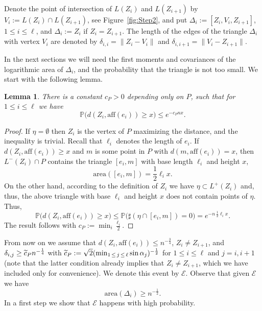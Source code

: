 \documentclass[10pt]{amsart}
\newtheorem{lemm}[theo]{Lemma}\newtheorem{prop}[theo]{Proposition}\newtheorem{coro}[theo]{Corollary}\newtheorem{conj}[theo]{Conjecture}
\theoremstyle{definition}\newtheorem{defi}[theo]{Definition}\newtheorem{rema}[theo]{Remark}\newtheorem{exam}[theo]{Example}\newtheorem{exem}[theo]{Example}\newtheorem{nota}[theo]{Notation}
\newcommand{\bbP}{\mathbb{P}}
\newcommand{\clE}{\mathcal{E}}
\newcommand{\area}{\mathrm{area}}
\newcommand{\aff}{\mathrm{aff}}
\let\oldtilde\tilde
\renewcommand*{\tilde}[1]{\mathchoice{\widetilde{#1}}{\widetilde{#1}}{\oldtilde{#1}}{\oldtilde{#1}}}
\begin{document}
Denote the point of intersection of $L(Z_i)$ and $L(Z_{i+1})$ by $V_{i}:=L(Z_i)\cap L(Z_{i+1})$, see Figure~\ref{fig:Step2}, and put $\Delta_i:=[Z_i,V_{i},Z_{i+1}]$, $1\leq i\leq \ell$, and $\Delta_i := Z_i$ if $Z_i=Z_{i+1}$. The length of the edges of the triangle $\Delta_i$ with vertex $V_i$ are denoted by $\delta_{i,i}=\|Z_i-V_i\| $ and $\delta_{i,i+1}= \| V_i - Z_{i+1} \| $.

In the next sections we will need the first moments and covariances of the logarithmic area of $\Delta_i$, and the probability that the triangle is not too small. We start with the following lemma.

\begin{lemm}\label{lm:smalldistanceedge}
There is a constant $c_P>0$ depending only on $P$, such that for $1\leq i\leq \ell$ we have
\[
\bbP\big(d(Z_{i}, \aff(e_i)) \geq x\big) \leq e^{- c_P n x}.
\]
\end{lemm}

\begin{proof}
If $\eta=\emptyset$ then $Z_i$ is the vertex of $P$ maximizing the distance, and the inequality is trivial. Recall that $\ell_i$ denotes the length of $e_i$. If $d(Z_{i}, \aff(e_i)) \geq x $ and $m$ is some point in $P$ with $d(m, \aff(e_i)) = x $, then $L^-(Z_i) \cap P$ contains the triangle $[e_i, m]$ with base length $\ell_i$ and height $x$,
\[
{\area}([e_i, m]) = \frac 12 \ell_i x.
\]
On the other hand, according to the definition of $Z_i$ we have $\eta \subset L^+(Z_i)$ and, thus, the above triangle with base $\ell_i$ and height $x$ does not contain points of $\eta$. Thus,
\[
\bbP\big(d(Z_{i}, \aff(e_i)) \geq x\big) \leq
\bbP\big(\sharp (\eta \cap [e_i, m]) =0\big) = e^{- n \, \frac 12 \ell_i x }.
\]
The result follows with $c_P:= \min_i \frac{\ell_i}2 $.
\end{proof}

From now on we assume that $d(Z_i, \aff(e_i)) \leq n^{- \frac 34}$, $Z_i \neq Z_{i+1}$, and $\delta_{i,j} \geq \tilde c_P n^{- \frac 14}$ with $\tilde c_P:=\sqrt{2}(\min_{1\,\leq\,j\,\leq\,\ell} \sin \alpha_j)^{-\frac12}$ for $1\leq i\leq \ell$ and $j=i, i+1$ (note that the latter condition already implies that $Z_i\neq Z_{i+1}$, which we have included only for convenience). We denote this event by $\clE$. Observe that given $\clE$ we have
\begin{equation}\label{eq:Delta>n-12}
{\area}(\Delta_i) \geq n^{- \frac 12}.
\end{equation}
In a first step we show that $\clE$ happens with high probability.
\end{document}
